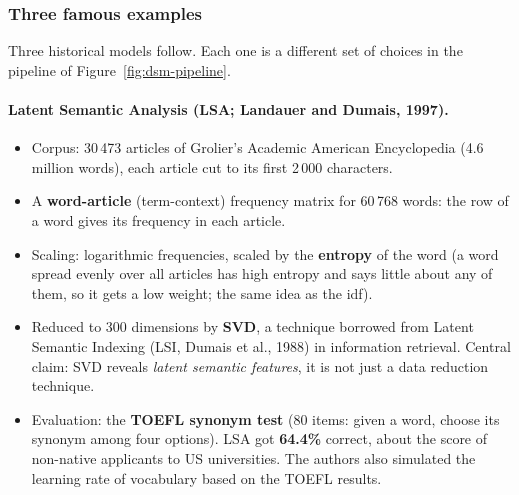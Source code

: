 \subsubsection{Three famous examples}

Three historical models follow. Each one is a different set of choices in the
pipeline of Figure~\ref{fig:dsm-pipeline}.

\paragraph{Latent Semantic Analysis (LSA; Landauer and Dumais, 1997).}
\begin{itemize}[nosep]
  \item Corpus: 30\,473 articles of Grolier's Academic American Encyclopedia (4.6
        million words), each article cut to its first 2\,000 characters.
  \item A \textbf{word-article} (term-context) frequency matrix for 60\,768 words: the row
        of a word gives its frequency in each article.
  \item Scaling: logarithmic frequencies, scaled by the \textbf{entropy} of the word
        (a word spread evenly over all articles has high entropy and says little about
        any of them, so it gets a low weight; the same idea as the idf).
  \item Reduced to 300 dimensions by \textbf{SVD}, a technique borrowed from Latent
        Semantic Indexing (LSI, Dumais et al., 1988) in information retrieval. Central
        claim: SVD reveals \emph{latent semantic features}, it is not just a data
        reduction technique.
  \item Evaluation: the \textbf{TOEFL synonym test} (80 items: given a word, choose its
        synonym among four options). LSA got \textbf{64.4\%} correct, about the score of
        non-native applicants to US universities. The authors also simulated the learning
        rate of vocabulary based on the TOEFL results.
\end{itemize}

